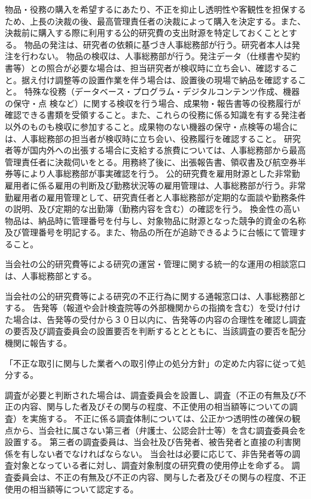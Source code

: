 \documentclass[10pt,a4paper,uplatex]{jsarticle}
\begin{document}
物品・役務の購入を希望するにあたり、不正を抑止し透明性や客観性を担保するため、上長の決裁の後、最高管理責任者の決裁によって購入を決定する。また、決裁前に購入する際に利用する公的研究費の支出財源を特定しておくこととする。
\term 物品の発注は、研究者の依頼に基づき人事総務部が行う。研究者本人は発注を行わない。 
\term 物品の検収は、人事総務部が行う。発注データ（仕様書や契約書等）との照合が必要な場合は、担当研究者が検収時に立ち会い、確認すること。据え付け調整等の設置作業を伴う場合は、設置後の現場で納品を確認すること。
\term 特殊な役務（データベース・プログラム・デジタルコンテンツ作成、機器の保守・点
検など）に関する検収を行う場合、成果物・報告書等の役務履行が確認できる書類を受領すること。また、これらの役務に係る知識を有する発注者以外のものも検収に参加すること。成果物のない機器の保守・点検等の場合には、人事総務部の担当者が検収時に立ち会い、役務履行を確認すること。
\term 研究者等が国内外への出張する場合に支給する旅費については、人事総務部から最高管理責任者に決裁伺いをとる。用務終了後に、出張報告書、領収書及び航空券半券等により人事総務部が事実確認を行う。
\term 公的研究費を雇用財源とした非常勤雇用者に係る雇用の判断及び勤務状況等の雇用管理は、人事総務部が行う。非常勤雇用者の雇用管理として、研究責任者と人事総務部が定期的な面談や勤務条件の説明、及び定期的な出勤簿（勤務内容を含む）の確認を行う。
\term 換金性の高い物品は、納品時に管理番号を付与し、対象物品に財源となった競争的資金の名称及び管理番号を明記する。また、物品の所在が追跡できるように台帳にて管理すること。

当会社の公的研究費等による研究の運営・管理に関する統一的な運用の相談窓口は、人事総務部とする。

当会社の公的研究費等による研究の不正行為に関する通報窓口は、人事総務部とする。
\term 告発等（報道や会計検査院等の外部機関からの指摘を含む）を受け付けた場合は、告発等の受付から３０日以内に、告発等の内容の合理性を確認し調査の要否及び調査委員会の設置要否を判断するととともに、当該調査の要否を配分機関に報告する。

「不正な取引に関与した業者への取引停止の処分方針」の定めた内容に従って処分する。

調査が必要と判断された場合は、調査委員会を設置し、調査（不正の有無及び不正の内容、関与した者及びその関与の程度、不正使用の相当額等についての調査）を実施する。
\term 不正に係る調査体制については、公正かつ透明性の確保の観点から、当会社に属さない第三者（弁護士、公認会計士等）を含む調査委員会を設置する。
\term 第三者の調査委員は、当会社及び告発者、被告発者と直接の利害関係を有しない者でなければならない。
\term 当会社は必要に応じて、非告発者等の調査対象となっている者に対し、調査対象制度の研究費の使用停止を命ずる。
\term 調査委員会は、不正の有無及び不正の内容、関与した者及びその関与の程度、不正使用の相当額等について認定する。
\end{document}
